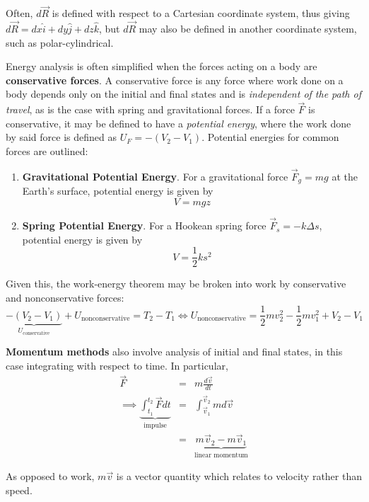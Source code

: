 Often, $d\vec{R}$ is defined with respect to a Cartesian coordinate system, thus giving $d\vec{R} = dx\hat i + dy\hat j + dz\hat k$, but $d\vec{R}$ may also be defined in another coordinate system, such as polar-cylindrical.

Energy analysis is often simplified when the forces acting on a body are \textbf{conservative forces}. A conservative force is any force where work done on a body depends only on the initial and final states and is \textit{independent of the path of travel}, as is the case with spring and gravitational forces. If a force $\vec{F}$ is conservative, it may be defined to have a \textit{potential energy}, where the work done by said force is defined as $U_F = -(V_2 - V_1)$. Potential energies for common forces are outlined:

\begin{enumerate}
    \item \textbf{Gravitational Potential Energy}. For a gravitational force $\vec{F}_g=mg$ at the Earth's surface, potential energy is given by \[V = mgz\]
    \item \textbf{Spring Potential Energy}. For a Hookean spring force $\vec{F}_s = -k\Delta s$, potential energy is given by \[V = \frac{1}{2}ks^2\]
\end{enumerate}

Given this, the work-energy theorem may be broken into work by conservative and nonconservative forces: \[\underbrace{-(V_2-V_1)}_{U_\text{conservative}} + U_\text{nonconservative} = T_2-T_1 \iff U_\text{nonconservative} = \frac{1}{2}mv_2^2 - \frac{1}{2}mv_1^2 + V_2 - V_1\]

\textbf{Momentum methods} also involve analysis of initial and final states, in this case integrating with respect to time. In particular, \begin{eqnarray*}
    \vec{F} &=& m\frac{d\vec{v}}{dt}\\
    \implies \underbrace{\int_{t_1}^{t_2} \vec{F}dt}_\text{impulse} &=& \int_{\vec{v}_1}^{\vec{v}_2}md\vec{v}\\
    &=& \underbrace{m\vec{v}_2 - m\vec{v}_1}_\text{linear momentum}
\end{eqnarray*}

As opposed to work, $m\vec{v}$ is a vector quantity which relates to velocity rather than speed.

